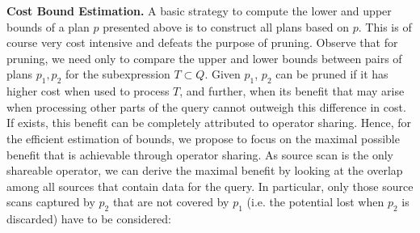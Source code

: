 
\textbf{Cost Bound Estimation.} 
A basic strategy to compute the lower and upper
bounds of a plan $p$ presented above is to construct all plans based on
$p$. This is of course very cost intensive and defeats the purpose of pruning. Observe that for pruning, we need only to compare the upper and lower bounds between pairs of plans $p_1,p_2$ for the subexpression $T \subset Q$. Given $p_1$, $p_2$ can be pruned if it has higher cost when used to process $T$, and further, when its benefit that may arise when processing other parts of the query cannot outweigh this difference in cost. If exists, this benefit can be completely attributed to operator sharing. Hence, for the efficient estimation of bounds, we propose to focus on the maximal possible benefit that is achievable through operator sharing. As source scan is the only shareable operator, we can derive the maximal benefit by looking at the overlap among all sources that contain data for the query. In particular, only those source scans captured by $p_2$ that are not covered by $p_1$ (i.e. the potential lost when $p_2$ is discarded) have to be considered: 

%

  
